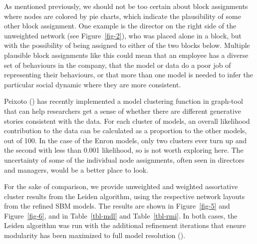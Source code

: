 \documentclass[
  12pt,
  a4paper,
  DIV=11,
  numbers=noendperiod,
  twoside,
  open=any]{scrartcl}
\begin{document}
As mentioned previously, we should not be too certain about block
assignments where nodes are colored by pie charts, which indicate the
plausibility of some other block assignment. One example is the director
on the right side of the unweighted network (see Figure~\ref{fig-2}),
who was placed alone in a block, but with the possibility of being
assigned to either of the two blocks below. Multiple plausible block
assignments like this could mean that an employee has a diverse set of
behaviours in the company, that the model or data do a poor job of
representing their behaviours, or that more than one model is needed to
infer the particular social dynamic where they are more consistent.

Peixoto () has recently
implemented a model clustering function in graph-tool that can help
researchers get a sense of whether there are different generative
stories consistent with the data. For each cluster of models, an overall
likelihood contribution to the data can be calculated as a proportion to
the other models, out of 100. In the case of the Enron models, only two
clusters ever turn up and the second with less than 0.001 likelihood, so
is not worth exploring here. The uncertainty of some of the individual
node assignments, often seen in directors and managers, would be a
better place to look.

For the sake of comparison, we provide unweighted and weighted
assortative cluster results from the Leiden algorithm, using the
respective network layouts from the refined SBM models. The results are
shown in Figure~\ref{fig-5} and Figure~\ref{fig-6}, and in
Table~\ref{tbl-mdl} and Table~\ref{tbl-rmi}. In both cases, the Leiden
algorithm was run with the additional refinement iterations that ensure
modularity has been maximized to full model resolution
().
\end{document}
